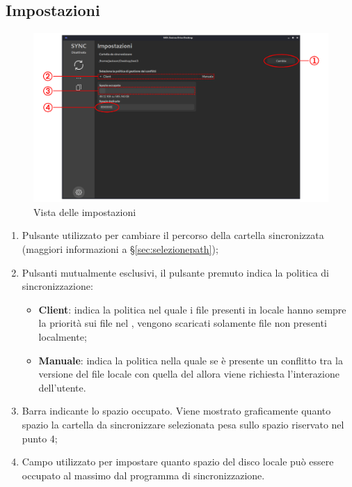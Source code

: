 \subsection{Impostazioni} \label{sec:impostazioni}
\begin{figure}[H]
    \centering
    \includegraphics[scale = 0.30]{components/img/settings.png}
    \caption{Vista delle impostazioni}
    \label{fig:Vista delle impostazioni}
\end{figure}
\begin{enumerate}
	\item Pulsante utilizzato per cambiare il percorso della cartella sincronizzata (maggiori informazioni a \S{}\ref{sec:selezionepath});
	\item Pulsanti mutualmente esclusivi, il pulsante premuto indica la politica di sincronizzazione:
	\begin{itemize}
		\item \textbf{Client}: indica la politica nel quale i file presenti in locale hanno sempre la priorità sui file nel , vengono scaricati solamente file non presenti localmente;
		\item \textbf{Manuale}: indica la politica nella quale se è presente un conflitto tra la versione del file locale con quella del  allora viene richiesta l'interazione dell'utente.
	\end{itemize}
	\item Barra indicante lo spazio occupato. Viene mostrato graficamente quanto spazio la cartella da sincronizzare selezionata pesa sullo spazio riservato nel punto 4;
	\item Campo utilizzato per impostare quanto spazio del disco locale può essere occupato al massimo dal programma di sincronizzazione.
\end{enumerate}